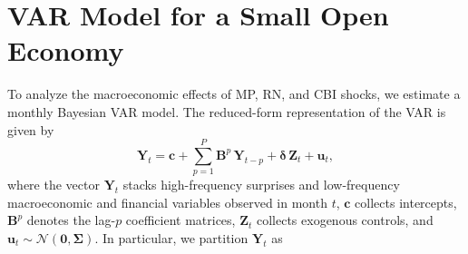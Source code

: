 \documentclass[\latexroot/\projectname]{subfiles}
\begin{document}
\section{VAR Model for a Small Open Economy}
\hypertarget{Section 4}{}

To analyze the macroeconomic effects of MP, RN, and CBI shocks, we estimate a monthly Bayesian VAR model. The reduced-form representation of the VAR is given by
\begin{equation}
  \boldsymbol{Y}_t
  = \boldsymbol{c}
  + \sum_{p=1}^{P} \boldsymbol{B}^{p}\,\boldsymbol{Y}_{t-p}
  + \boldsymbol{\delta}\,\boldsymbol{Z}_t
  + \boldsymbol{u}_t ,
\end{equation}
where the vector $\boldsymbol{Y}_t$ stacks high-frequency surprises and low-frequency macroeconomic and financial variables observed in month $t$, $\boldsymbol{c}$ collects intercepts, $\boldsymbol{B}^{p}$ denotes the lag-$p$ coefficient matrices, $\boldsymbol{Z}_t$ collects exogenous controls, and $\boldsymbol{u}_t \sim \mathcal{N}\!\left(\mathbf{0},\boldsymbol{\Sigma}\right)$. In particular, we partition $\boldsymbol{Y}_t$ as
\end{document}
